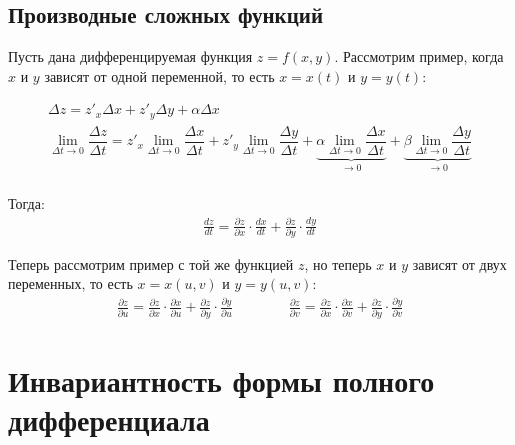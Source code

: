 \documentclass[a4paper,12pt,oneside]{extbook}
\theoremstyle{numbered}
\theoremstyle{unnumbered}
\theoremstyle{named}
\theoremstyle{unnumbered}
\theoremstyle{named}
\theoremstyle{named}
\theoremstyle{named}
\begin{document}
\subsection{Производные сложных функций}%
\label{sub:Производные сложных функций}

Пусть дана дифференцируемая функция \(z = f(x, y)\). Рассмотрим пример, когда \(x\) и \(y\) зависят от одной переменной, то есть \(x = x(t)\) и \(y = y(t)\):

\begin{gather*}
    \Delta z = z'_x \Delta x + z'_y \Delta y + \alpha \Delta x \\
    \lim_{\Delta t \to 0}{\dfrac{\Delta z}{\Delta t}} =
    z'_x \lim_{\Delta t \to 0}{\dfrac{\Delta x}{\Delta t}} +
    z'_y \lim_{\Delta t \to 0}{\dfrac{\Delta y}{\Delta t}} +
    \underbrace{\alpha \lim_{\Delta t \to 0}{\dfrac{\Delta x}{\Delta t}}}_{\to 0}+
    \underbrace{\beta \lim_{\Delta t \to 0}{\dfrac{\Delta y}{\Delta t}}}_{\to 0} \\
\end{gather*}


Тогда:
\begin{gather*}
    \frac{dz}{dt} = \frac{\partial z}{\partial x} \cdot \frac{dx}{dt} + \frac{\partial z}{\partial y} \cdot \frac{dy}{dt}
\end{gather*}

Теперь рассмотрим пример с той же функцией \(z\), но теперь \(x\) и \(y\) зависят от двух переменных, то есть \(x = x(u, v)\) и \(y = y(u, v)\):
\begin{gather*}
    \frac{\partial z}{\partial u} = \frac{\partial z}{\partial x} \cdot \frac{\partial x}{\partial u} + \frac{\partial z}{\partial y} \cdot \frac{\partial y}{\partial u}
    \qquad \qquad
    \frac{\partial z}{\partial v} = \frac{\partial z}{\partial x} \cdot \frac{\partial x}{\partial v} + \frac{\partial z}{\partial y} \cdot \frac{\partial y}{\partial v}
\end{gather*}

\section{Инвариантность формы полного дифференциала}%
\label{sec:Инвариантность формы полного дифференциала}
\end{document}
